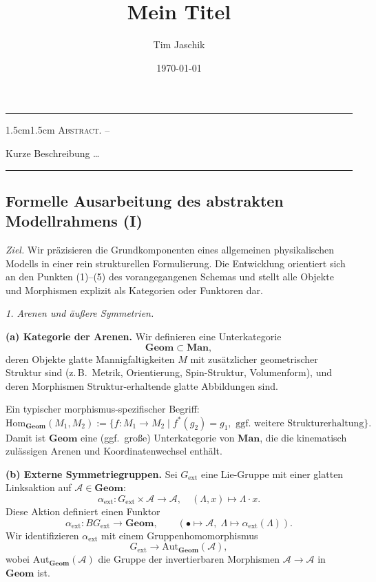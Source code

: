 \documentclass[10pt, letterpaper]{article}
\title{Mein Titel}
\author{Tim Jaschik}
\date{\today}
\newcommand{\Aut}{\mathrm{Aut}}
\renewenvironment{abstract}
  {
    \begin{adjustwidth}{1.5cm}{1.5cm}
    \small
    \textsc{Abstract. –}%
  }
  {
    \end{adjustwidth}
  }
\begin{document}
\maketitle
\rule{\textwidth}{0.5pt}
\begin{abstract}
Kurze Beschreibung …
\end{abstract}
\rule{\textwidth}{0.5pt}
\vspace{0.5cm}

\tableofcontents

\pagebreak

\subsection{Formelle Ausarbeitung des abstrakten Modellrahmens (I)}

\emph{Ziel.}
Wir präzisieren die Grundkomponenten eines allgemeinen physikalischen Modells
in einer rein strukturellen Formulierung. Die Entwicklung orientiert sich an den
Punkten (1)--(5) des vorangegangenen Schemas und stellt alle Objekte und
Morphismen explizit als Kategorien oder Funktoren dar.

\bigskip
\emph{1. Arenen und äußere Symmetrien.}

\textbf{(a) Kategorie der Arenen.}
Wir definieren eine Unterkategorie
\[
\mathbf{Geom} \subset \mathbf{Man},
\]
deren Objekte glatte Mannigfaltigkeiten $M$ mit zusätzlicher geometrischer
Struktur sind (z.\,B.\ Metrik, Orientierung, Spin-Struktur, Volumenform),
und deren Morphismen Struktur-erhaltende glatte Abbildungen sind.

Ein typischer morphismus-spezifischer Begriff:
\[
\mathrm{Hom}_{\mathbf{Geom}}(M_1,M_2)
:=\{f:M_1\to M_2\mid f^\ast(g_2)=g_1,\text{ ggf.\ weitere Strukturerhaltung}\}.
\]
Damit ist $\mathbf{Geom}$ eine (ggf.\ große) Unterkategorie von $\mathbf{Man}$,
die die kinematisch zulässigen Arenen und Koordinatenwechsel enthält.

\textbf{(b) Externe Symmetriegruppen.}
Sei $G_{\mathrm{ext}}$ eine Lie-Gruppe mit einer glatten Linksaktion auf $\mathcal A\in\mathbf{Geom}$:
\[
\alpha_{\mathrm{ext}}: G_{\mathrm{ext}}\times \mathcal A \to \mathcal A,
\quad (\Lambda,x)\mapsto \Lambda\cdot x.
\]
Diese Aktion definiert einen Funktor
\[
\alpha_{\mathrm{ext}}: BG_{\mathrm{ext}} \to \mathbf{Geom},\qquad
(\bullet\mapsto \mathcal A,\; \Lambda\mapsto\alpha_{\mathrm{ext}}(\Lambda)).
\]
Wir identifizieren $\alpha_{\mathrm{ext}}$ mit einem Gruppenhomomorphismus
\[
G_{\mathrm{ext}}\longrightarrow \Aut_{\mathbf{Geom}}(\mathcal A),
\]
wobei $\Aut_{\mathbf{Geom}}(\mathcal A)$ die Gruppe der invertierbaren Morphismen
$\mathcal A\to \mathcal A$ in $\mathbf{Geom}$ ist.
\end{document}
